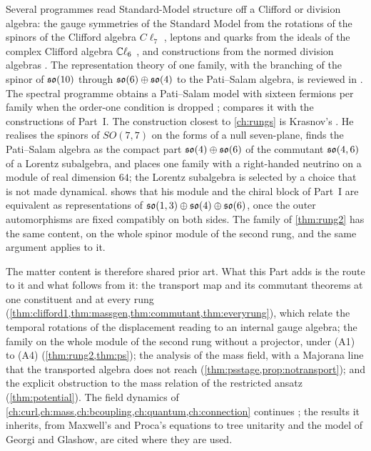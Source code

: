 Several programmes read Standard-Model structure off a Clifford or division algebra: the gauge symmetries of the Standard Model from the
rotations of the spinors of the Clifford algebra $C\ell_7$ \cite{TraylingBaylis01}, leptons and quarks from the ideals of the complex Clifford
algebra $\mathbb{C}\ell_6$ \cite{Stoica18}, and constructions from the normed division algebras \cite{Furey,Gresnigt}. The representation theory of
one family, with the branching of the spinor of $\mathfrak{so}(10)$ through $\mathfrak{so}(6)\oplus\mathfrak{so}(4)$ to the Pati--Salam algebra, is reviewed in
\cite{BaezHuerta10}. The spectral programme obtains a Pati--Salam model with sixteen fermions per family when the order-one condition is
dropped \cite{ChamseddineConnesVanSuijlekom13};  compares it with the constructions of Part~I. The construction closest to
\cref{ch:rungs} is Krasnov's \cite{Krasnov18}. He realises the spinors of $SO(7,7)$ on the forms of a null seven-plane, finds the Pati--Salam
algebra as the compact part $\mathfrak{so}(4)\oplus\mathfrak{so}(6)$ of the commutant $\mathfrak{so}(4,6)$ of a Lorentz subalgebra, and places one family with a right-handed
neutrino on a module of real dimension $64$; the Lorentz subalgebra is selected by a choice that is not made dynamical. 
shows that his module and the chiral block of Part~I are equivalent as representations of $\mathfrak{so}(1,3)\oplus\mathfrak{so}(4)\oplus\mathfrak{so}(6)$, once the outer
automorphisms are fixed compatibly on both sides. The family of \cref{thm:rung2} has the same content, on the whole spinor module of the
second rung, and the same argument applies to it.

The matter content is therefore shared prior art. What this Part adds is the route to it and what follows from it: the transport map and its
commutant theorems at one constituent and at every rung (\cref{thm:clifford1,thm:massgen,thm:commutant,thm:everyrung}), which relate the
temporal rotations of the displacement reading to an internal gauge algebra; the family on the whole module of the second rung without a
projector, under (A1) to (A4) (\cref{thm:rung2,thm:ps}); the analysis of the mass field, with a Majorana line that the transported algebra
does not reach (\cref{thm:psstage,prop:notransport}); and the explicit obstruction to the mass relation of the restricted ansatz
(\cref{thm:potential}). The field dynamics of \cref{ch:curl,ch:mass,ch:bcoupling,ch:quantum,ch:connection} continues ; the
results it inherits, from Maxwell's and Proca's equations to tree unitarity and the model of Georgi and Glashow, are cited where they are
used.

